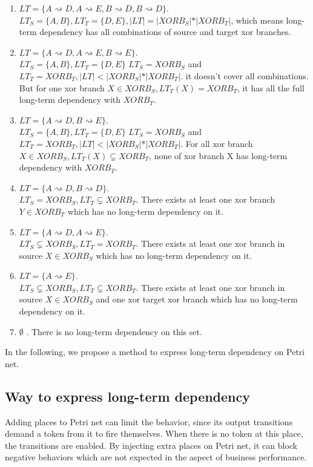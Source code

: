 \begin{enumerate}
	\item $LT=\{ A\rightsquigarrow D, A\rightsquigarrow E, B\rightsquigarrow D, B\rightsquigarrow D\}$. \\
	$LT_S = \{A,B\}, LT_T=\{D,E\}, \vert LT \vert = \vert XORB_S \vert * \vert XORB_T \vert  $, which means long-term dependency has all combinations of source and target xor branches. 
	\item $LT=\{ A\rightsquigarrow D, A\rightsquigarrow E, B\rightsquigarrow E\}. $\\
	$LT_S = \{A,B\}, LT_T=\{D,E\}$
	$LT_S = XORB_S $ and $LT_T = XORB_T, \vert LT \vert < \vert XORB_S \vert * \vert XORB_T \vert $. it doesn't cover all combinations. But for one xor branch $X \in XORB_S, LT_T(X)= XORB_T$, it has all the full long-term dependency with $XORB_T$. 
	\item $LT=\{ A\rightsquigarrow D, B\rightsquigarrow E\}. $\\
	$LT_S = \{A,B\}, LT_T=\{D,E\}$
	$LT_S = XORB_S $ and $LT_T = XORB_T, \vert LT \vert < \vert XORB_S \vert * \vert XORB_T \vert $. For all xor branch $X \in XORB_S, LT_T(X) \subsetneq XORB_T$, none of xor branch X has long-term dependency with $XORB_T$.
	\item $LT=\{ A\rightsquigarrow D, B\rightsquigarrow D\}.$ \\
	$LT_S = XORB_S ,  LT_T \subsetneq XORB_T$. There exists at least one xor branch $Y \in XORB_T$ which has no long-term dependency on it.
	\item $LT=\{ A\rightsquigarrow D, A\rightsquigarrow E\}.$ \\
	$LT_S \subsetneq XORB_S ,  LT_T = XORB_T$.
	There exists at least one xor branch in source $X \in XORB_S$ which has no long-term dependency on it.
	\item $LT=\{ A\rightsquigarrow E\}. $\\
	$LT_S \subsetneq XORB_S ,  LT_T \subsetneq XORB_T$.
	There exists at least one xor branch in source $X \in XORB_S$  and one xor target xor branch which has no long-term dependency on it.
	\item $ \emptyset$ . There is no long-term dependency on this set. 
\end{enumerate}
In the following, we propose a method to express long-term dependency on Petri net. 
\subsection{Way to express long-term dependency}
Adding places to Petri net can limit the behavior\cite{bergenthum2007process}, since its output transitions demand a token from it to fire themselves. When there is no token at this place, the transitions are enabled. By injecting extra places on Petri net, it can block negative behaviors which are not expected in the aspect of business performance. 

